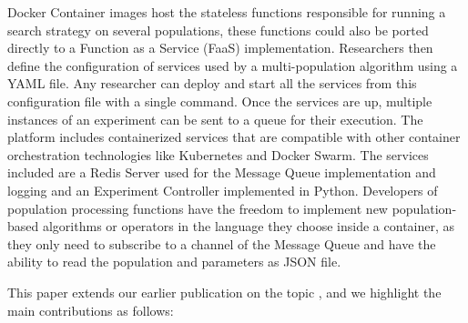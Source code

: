 \documentclass[review]{elsarticle}
\begin{document}
Docker Container images host the stateless functions responsible for running 
a search strategy on several populations, these functions could also be ported
directly to a Function as a Service (FaaS) \cite{Roberts2016} implementation.
Researchers then define the configuration of services used by
a multi-population algorithm using a YAML file. Any researcher can deploy and
start all the services from this configuration file with a single command. Once
the services are up, multiple instances of an experiment can be sent to a queue
for their execution. The platform includes containerized services that are
compatible with other container orchestration technologies like Kubernetes and
Docker Swarm. The services included are a Redis Server used for the Message
Queue implementation and logging and an Experiment Controller implemented in
Python. Developers of population processing functions have the freedom to
implement new population-based algorithms or operators in the language they
choose inside a container, as they only need to subscribe to a channel of the
Message Queue and have the ability to read the population and parameters as JSON  
file.

This paper extends our earlier publication on the topic
\cite{guervos2018introducing}, and we highlight the main contributions as
follows:
\end{document}
